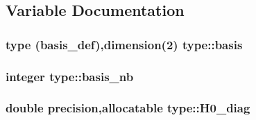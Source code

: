\subsection{Variable Documentation}
\hypertarget{namespacetype_a398941ef8f9eeb6255ff44e9ba5d23b1}{
\subsubsection[{basis}]{\setlength{\rightskip}{0pt plus 5cm}type ({\bf basis\_\-def}),dimension(2) {\bf type::basis}}}
\label{namespacetype_a398941ef8f9eeb6255ff44e9ba5d23b1}
\hypertarget{namespacetype_a8147b0e65a57c1e13f37406eb567974c}{
\subsubsection[{basis\_\-nb}]{\setlength{\rightskip}{0pt plus 5cm}integer {\bf type::basis\_\-nb}}}
\label{namespacetype_a8147b0e65a57c1e13f37406eb567974c}
\hypertarget{namespacetype_a5059bb126df0403fee858f273ff2393d}{
\subsubsection[{H0\_\-diag}]{\setlength{\rightskip}{0pt plus 5cm}double precision,allocatable {\bf type::H0\_\-diag}}}
\label{namespacetype_a5059bb126df0403fee858f273ff2393d}
